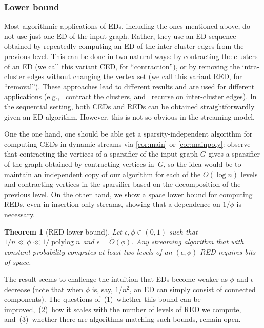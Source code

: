 \documentclass[epsfig,letter,11pt]{article}
\numberwithin{equation}{section}
\newcommand{\otil}{\tilde{O}}
\renewcommand{\tilde}{\widetilde}
\DeclareMathOperator*{\pylog}{polylog}
\newtheorem{mainthsimple}{Theorem}
\begin{document}
\subsubsection*{Lower bound}
Most algorithmic applications of EDs, including the ones mentioned above, do not use just one ED of the input graph. Rather, they use an ED sequence obtained by repeatedly computing an ED of the inter-cluster edges from the previous level. This can be done in two natural ways: by contracting the clusters of an ED (we call this variant CED, for “contraction”), or by removing the intra-cluster edges without changing the vertex set (we call this variant RED, for “removal”). These approaches lead to different results and are used for different applications (e.g.,~\cite{boundlink,mincutjli} contract the clusters, and~\cite{stspectral, maxflow} recurse on inter-cluster edges). In the sequential setting, both CEDs and REDs can be obtained straightforwardly given an ED algorithm. However, this is not so obvious in the streaming model.

One the one hand, one should be able get a sparsity-independent algorithm for computing CEDs in dynamic streams via \cref{cor:main} or \cref{cor:mainpoly}: observe that contracting the vertices of a sparsifier of the input graph $G$  gives a sparsifier of the graph obtained by contracting vertices in~$G$, so the idea would be to maintain an independent copy of our algorithm for each of the $O(\log n)$ levels and contracting vertices in the sparsifier based on the decomposition of the previous level. On the other hand, we show a space lower bound for computing REDs, even in insertion only streams, showing that a dependence on $1/\phi$ is necessary.


\begin{mainthsimple}[RED lower bound]
	\label{th:lbsimple}
	Let $\epsilon,\phi \in (0,1)$ such that $1/n \ll \phi \ll 1/\pylog n$ and $ \epsilon =\otil( \phi)$. Any streaming algorithm that with constant probability computes at least two levels of an $(\epsilon,\phi)$-RED requires  bits of space.
\end{mainthsimple}


\noindent
The result seems to challenge the intuition that EDs become weaker as $\phi$ and $\epsilon$ decrease (note that when $\phi$ is, say, $1/n^2$, an ED can simply consist of connected components). The questions of~(1)~whether this bound can be improved,~(2)~how it scales with the number of levels of RED we compute, and~(3)~whether there are algorithms matching such bounds, remain open.
\end{document}

